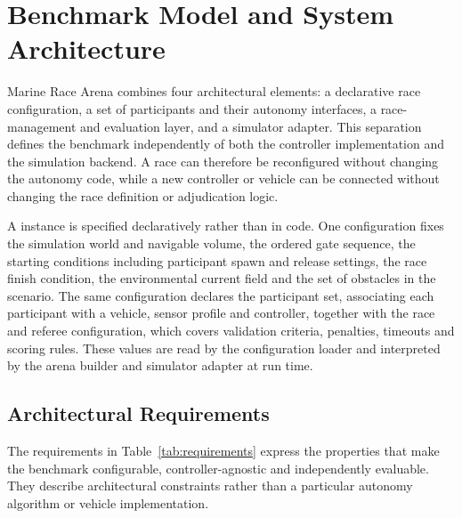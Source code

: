 \section{Benchmark Model and System Architecture}
\label{sec:benchmark_model}

Marine Race Arena combines four architectural elements: a declarative race
configuration, a set of participants and their autonomy interfaces, a
race-management and evaluation layer, and a simulator adapter. This separation
defines the benchmark independently of both the controller implementation and
the simulation backend. A race can therefore be reconfigured without changing
the autonomy code, while a new controller or vehicle can be connected without
changing the race definition or adjudication logic.

A \mra{} instance is specified declaratively rather than in code. One
configuration fixes the simulation world and navigable volume, the ordered gate
sequence, the starting conditions including participant spawn and release
settings, the race finish condition, the environmental current field and the set
of obstacles in the scenario. The same configuration declares the participant
set, associating each participant with a vehicle, sensor profile and controller,
together with the race and referee configuration, which covers validation
criteria, penalties, timeouts and scoring rules. These values are read by the
configuration loader and interpreted by the arena builder and simulator adapter
at run time.

\subsection{Architectural Requirements}

The requirements in Table~\ref{tab:requirements} express the properties that
make the benchmark configurable, controller-agnostic and independently
evaluable. They describe architectural constraints rather than a particular
autonomy algorithm or vehicle implementation.

